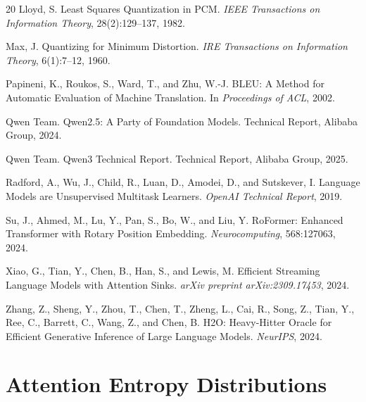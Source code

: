 \documentclass[11pt]{article}
\begin{document}
\begin{thebibliography}{20}
Lloyd, S.
\newblock Least Squares Quantization in PCM.
\newblock \emph{IEEE Transactions on Information Theory}, 28(2):129--137, 1982.

Max, J.
\newblock Quantizing for Minimum Distortion.
\newblock \emph{IRE Transactions on Information Theory}, 6(1):7--12, 1960.

Papineni, K., Roukos, S., Ward, T., and Zhu, W.-J.
\newblock BLEU: A Method for Automatic Evaluation of Machine Translation.
\newblock In \emph{Proceedings of ACL}, 2002.

Qwen Team.
\newblock Qwen2.5: A Party of Foundation Models.
\newblock Technical Report, Alibaba Group, 2024.

Qwen Team.
\newblock Qwen3 Technical Report.
\newblock Technical Report, Alibaba Group, 2025.

Radford, A., Wu, J., Child, R., Luan, D., Amodei, D., and Sutskever, I.
\newblock Language Models are Unsupervised Multitask Learners.
\newblock \emph{OpenAI Technical Report}, 2019.

Su, J., Ahmed, M., Lu, Y., Pan, S., Bo, W., and Liu, Y.
\newblock RoFormer: Enhanced Transformer with Rotary Position Embedding.
\newblock \emph{Neurocomputing}, 568:127063, 2024.

Xiao, G., Tian, Y., Chen, B., Han, S., and Lewis, M.
\newblock Efficient Streaming Language Models with Attention Sinks.
\newblock \emph{arXiv preprint arXiv:2309.17453}, 2024.

Zhang, Z., Sheng, Y., Zhou, T., Chen, T., Zheng, L., Cai, R., Song, Z., Tian, Y., Ree, C., Barrett, C., Wang, Z., and Chen, B.
\newblock H2O: Heavy-Hitter Oracle for Efficient Generative Inference of Large Language Models.
\newblock \emph{NeurIPS}, 2024.

\end{thebibliography}
\endgroup

\appendix
\section{Attention Entropy Distributions}
\label{app:entropy}
\end{document}
